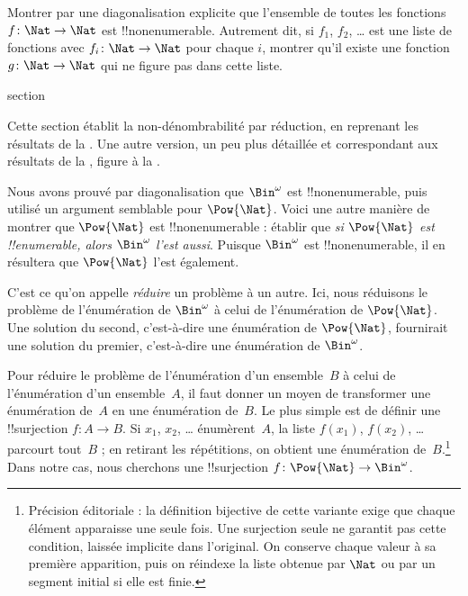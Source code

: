 \documentclass[11pt,a4paper,openany]{memoir}
\begin{document}
\begin{prob}
Montrer par une diagonalisation explicite que l'ensemble de toutes
les fonctions $f \colon \Nat \to \Nat$ est !!{nonenumerable}.
Autrement dit, si $f_1$, $f_2$, \dots{} est une liste de fonctions
avec $f_i\colon \Nat \to \Nat$ pour chaque $i$, montrer qu'il
existe une fonction $g \colon \Nat \to \Nat$ qui ne figure
pas dans cette liste.
\end{prob}


\endgroup


\begingroup
\expandafter\def\csname ol@sectioncs\endcsname{section}
\def\olfilename{reduction-alt}




\begin{editorial}
  Cette section établit la non-dénombrabilité par réduction, en
  reprenant les résultats de la . Une autre
  version, un peu plus détaillée et correspondant aux résultats
  de la , figure à la .
\end{editorial}

Nous avons prouvé par diagonalisation que $\Bin^\omega$ est
!!{nonenumerable}, puis utilisé un argument semblable pour
$\Pow{\Nat}$. Voici une autre manière de montrer que
$\Pow{\Nat}$ est !!{nonenumerable} : établir que \emph{si
$\Pow{\Nat}$ est !!{enumerable}, alors $\Bin^\omega$ l'est
aussi}. Puisque $\Bin^\omega$ est !!{nonenumerable}, il en
résultera que $\Pow{\Nat}$ l'est également.

C'est ce qu'on appelle \emph{réduire} un problème à un autre.
Ici, nous réduisons le problème de l'énumération de $\Bin^\omega$
à celui de l'énumération de $\Pow{\Nat}$. Une solution du second,
c'est-à-dire une énumération de $\Pow{\Nat}$, fournirait une
solution du premier, c'est-à-dire une énumération de $\Bin^\omega$.

Pour réduire le problème de l'énumération d'un ensemble~$B$ à
celui de l'énumération d'un ensemble~$A$, il faut donner un moyen
de transformer une énumération de~$A$ en une énumération de~$B$.
Le plus simple est de définir une !!{surjection} $f\colon A \to B$.
Si $x_1$, $x_2$, \dots{} énumèrent~$A$, la liste $f(x_1)$,
$f(x_2)$, \dots{} parcourt tout~$B$ ; en retirant les répétitions,
on obtient une énumération de~$B$.\footnote{Précision éditoriale :
la définition bijective de cette variante exige que chaque élément
apparaisse une seule fois. Une surjection seule ne garantit pas
cette condition, laissée implicite dans l'original. On conserve
chaque valeur à sa première apparition, puis on réindexe la liste
obtenue par $\Nat$ ou par un segment initial si elle est finie.}
Dans notre cas, nous cherchons une !!{surjection}
$f\colon \Pow{\Nat} \to \Bin^\omega$.
\end{document}
